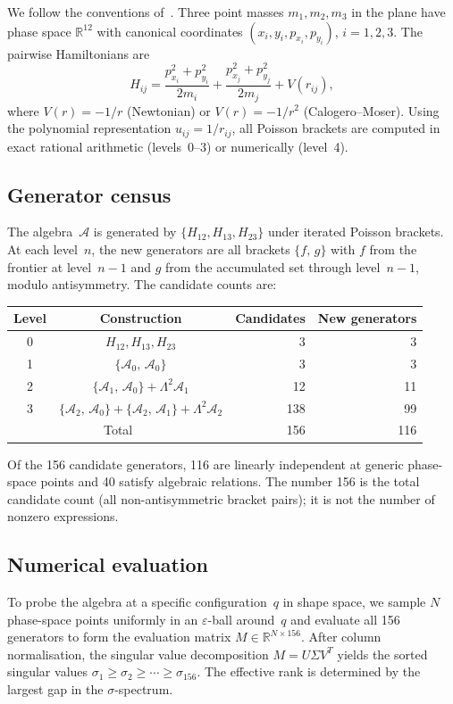 \documentclass[11pt,a4paper]{article}
\theoremstyle{remark}
\newcommand{\pb}[2]{\{#1,\,#2\}}
\newcommand{\R}{\mathbb{R}}
\newcommand{\cA}{\mathcal{A}}
\begin{document}
We follow the conventions of~\cite{paper1}.  Three point
masses $m_1, m_2, m_3$ in the plane have phase space
$\R^{12}$ with canonical coordinates
$(x_i, y_i, p_{x_i}, p_{y_i})$, $i = 1,2,3$.  The pairwise
Hamiltonians are
\[
  H_{ij} = \frac{p_{x_i}^2 + p_{y_i}^2}{2m_i}
          + \frac{p_{x_j}^2 + p_{y_j}^2}{2m_j}
          + V(r_{ij}),
\]
where $V(r) = -1/r$ (Newtonian) or $V(r) = -1/r^2$
(Calogero--Moser).  Using the polynomial representation
$u_{ij} = 1/r_{ij}$, all Poisson brackets are computed
in exact rational arithmetic (levels~0--3) or numerically
(level~4).

\subsection{Generator census}

The algebra~$\cA$ is generated by $\{H_{12}, H_{13},
H_{23}\}$ under iterated Poisson brackets.  At each
level~$n$, the new generators are all brackets
$\pb{f}{g}$ with $f$ from the frontier at level~$n-1$
and $g$ from the accumulated set through level~$n-1$,
modulo antisymmetry.  The candidate counts are:
\begin{center}
\begin{tabular}{@{}ccrr@{}}
\toprule
Level & Construction & Candidates & New generators \\
\midrule
0 & $H_{12}, H_{13}, H_{23}$ & 3 & 3 \\
1 & $\pb{\cA_0}{\cA_0}$ & 3 & 3 \\
2 & $\pb{\cA_1}{\cA_0} + \Lambda^2\cA_1$ & 12 & 11 \\
3 & $\pb{\cA_2}{\cA_0} + \pb{\cA_2}{\cA_1}
    + \Lambda^2\cA_2$ & 138 & 99 \\
\midrule
\multicolumn{2}{c}{Total} & 156 & 116 \\
\bottomrule
\end{tabular}
\end{center}
Of the 156 candidate generators, 116 are linearly
independent at generic phase-space points and 40 satisfy
algebraic relations.  The number 156 is the total
candidate count (all non-antisymmetric bracket pairs);
it is not the number of nonzero expressions.

\subsection{Numerical evaluation}

To probe the algebra at a specific configuration~$q$ in
shape space, we sample $N$ phase-space points uniformly
in an $\varepsilon$-ball around~$q$ and evaluate all 156
generators to form the evaluation matrix
$M \in \R^{N \times 156}$.  After column
normalisation, the singular value decomposition
$M = U\Sigma V^T$ yields the sorted singular values
$\sigma_1 \ge \sigma_2 \ge \cdots \ge \sigma_{156}$.
The effective rank is determined by the largest gap in the
$\sigma$-spectrum.
\end{document}
